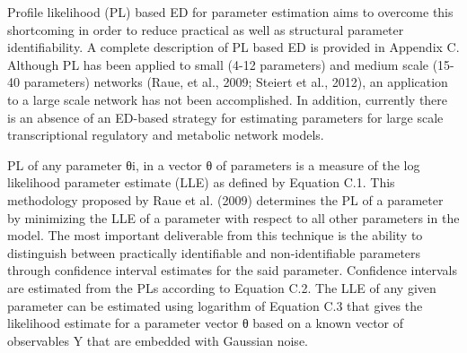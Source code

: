\documentclass[10pt]{report}
\begin{document}
Profile likelihood (PL) based ED for parameter estimation aims to overcome this shortcoming in order to reduce practical as well as structural parameter identifiability. A complete description of PL based ED is provided in Appendix C. Although PL has been applied to small (4-12 parameters) and medium scale (15-40 parameters) networks (Raue, et al., 2009; Steiert et al., 2012), an application to a large scale network has not been accomplished. In addition, currently there is an absence of an ED-based strategy for estimating parameters for large scale transcriptional regulatory and metabolic network models.

PL of any parameter θi,   in a vector θ of parameters is a measure of the log likelihood parameter estimate (LLE) as defined by Equation C.1. This methodology proposed by Raue et al. (2009) determines the PL of a parameter by minimizing the LLE of a parameter with respect to all other parameters in the model. The most important deliverable from this technique is the ability to distinguish between practically identifiable and non-identifiable parameters through confidence interval estimates for the said parameter. Confidence intervals are estimated from the PLs according to Equation C.2. The LLE of any given parameter can be estimated using logarithm of Equation C.3 that gives the likelihood estimate for a parameter vector θ based on a known vector of observables Y that are embedded with Gaussian noise.
\end{document}
